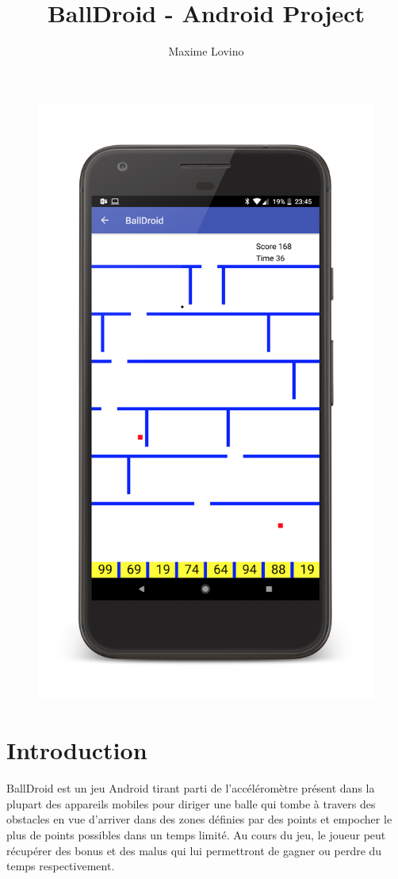 \documentclass{article}
\title{BallDroid - Android Project}
\author{Maxime Lovino}
\begin{document}
\maketitle
\begin{figure}[H]
    \centering
	\includegraphics[height=0.7\textheight]{BallDroid_Device_Screen.png}
\end{figure}
\newpage
\section{Introduction}
BallDroid est un jeu Android tirant parti de l'accéléromètre présent dans la plupart des appareils mobiles pour diriger une balle qui tombe à travers des obstacles en vue d'arriver dans des zones définies par des points et empocher le plus de points possibles dans un temps limité. Au cours du jeu, le joueur peut récupérer des bonus et des malus qui lui permettront de gagner ou perdre du temps respectivement.
\end{document}
